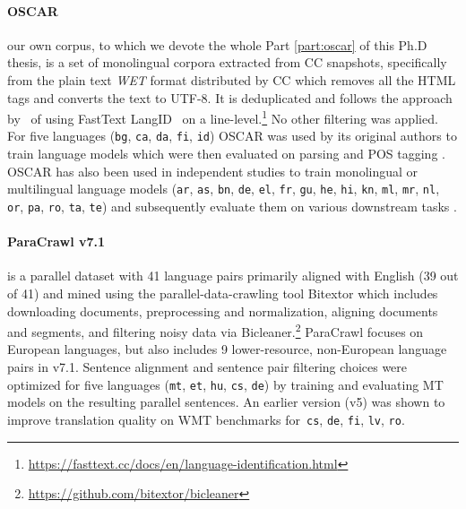 \paragraph{OSCAR~\citep{ortiz-suarez-etal-2019-asynchronous, ortiz-suarez-etal-2020-monolingual}} our own corpus, to which we devote the whole Part \ref{part:oscar} of this Ph.D thesis, is a set of monolingual corpora extracted from CC snapshots, specifically from the plain text \emph{WET} format distributed by CC which removes all the HTML tags and converts the text to UTF-8. It is deduplicated and follows the approach by~\citep{grave-etal-2018-learning} of using FastText LangID~\citep{joulin-etal-2016-fasttext, joulin-etal-2017-bag} on a line-level.\footnote{\url{https://fasttext.cc/docs/en/language-identification.html} } No other filtering was applied. For five languages (\texttt{bg}, \texttt{ca}, \texttt{da}, \texttt{fi}, \texttt{id}) OSCAR was used by its original authors to train language models which were then evaluated on parsing and POS tagging \citep{ortiz-suarez-etal-2020-monolingual}. OSCAR has also been used in independent studies to train monolingual or multilingual language models (\texttt{ar}, \texttt{as}, \texttt{bn}, \texttt{de}, \texttt{el}, \texttt{fr}, \texttt{gu}, \texttt{he}, \texttt{hi}, \texttt{kn}, \texttt{ml}, \texttt{mr}, \texttt{nl}, \texttt{or}, \texttt{pa}, \texttt{ro}, \texttt{ta}, \texttt{te}) and subsequently evaluate them on various downstream tasks \citep{antoun-etal-2021-araelectra, kakwani-etal-2020-indicnlpsuite, wilie-etal-2020-indonlu, chan-etal-2020-germans, koutsikakis-etal-2020-greek, martin-etal-2020-camembert, chriqui-etal-2021-hebert, seker-etal-2021-alephbert, delobelle-etal-2020-robbert, dumitrescu-etal-2020-birth, masala-etal-2020-robert}.


\paragraph{ParaCrawl v7.1} is a parallel dataset with 41 language pairs primarily aligned with English (39 out of 41) and mined using the parallel-data-crawling tool Bitextor \citep{espla-etal-2019-paracrawl,banon-etal-2020-paracrawl} which includes downloading documents, preprocessing and normalization, aligning documents and segments, and filtering noisy data via Bicleaner.\footnote{\url{https://github.com/bitextor/bicleaner}}
ParaCrawl focuses on European languages, but also includes 9 lower-resource, non-European language pairs in v7.1. Sentence alignment and sentence pair filtering choices were optimized for five languages (\texttt{mt}, \texttt{et}, \texttt{hu}, \texttt{cs}, \texttt{de}) by training and evaluating MT models on the resulting parallel sentences. An earlier version (v5) was shown to improve translation quality on WMT benchmarks for~\texttt{cs}, \texttt{de}, \texttt{fi}, \texttt{lv}, \texttt{ro}.


